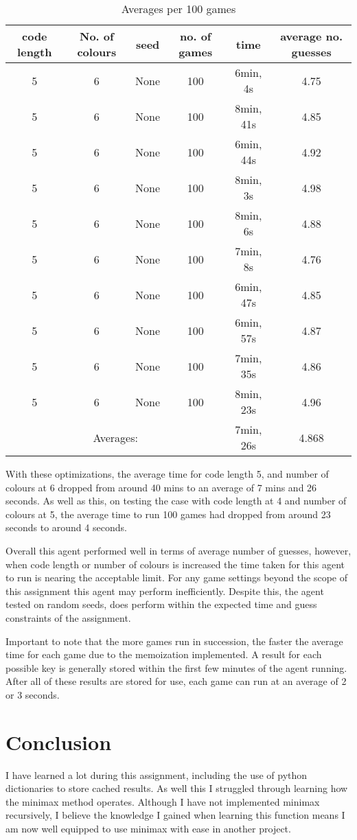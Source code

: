 \documentclass[12pt]{article}
\begin{document}
\begin{table}[htbp]
\centering
\begin{tabular}{|c|c|c|c|c|c|}
\hline
code length & No. of colours & seed & no. of games & time & average no. guesses\\\hline
5 & 6 & None & 100 & 6min, 4s & 4.75\\
5 & 6 & None & 100 & 8min, 41s & 4.85\\
5 & 6 & None & 100 & 6min, 44s & 4.92\\
5 & 6 & None & 100 & 8min, 3s & 4.98\\
5 & 6 & None & 100 & 8min, 6s & 4.88\\
5 & 6 & None & 100 & 7min, 8s & 4.76\\
5 & 6 & None & 100 & 6min, 47s & 4.85\\
5 & 6 & None & 100 & 6min, 57s & 4.87\\
5 & 6 & None & 100 & 7min, 35s & 4.86\\
5 & 6 & None & 100 & 8min, 23s & 4.96\\
\hline
\multicolumn{4}{|c|}{Averages: } & 7min, 26s & 4.868\\
\hline
\end{tabular}
\caption{\label{tab:results2}Averages per 100 games}
\end{table}
With these optimizations, the average time for code length 5, and number of colours at 6 dropped from around 40 mins to an average of 7 mins and 26 seconds. As well as this, on testing the case with code length at 4 and number of colours at 5, the average time to run 100 games had dropped from around 23 seconds to around 4 seconds.

Overall this agent performed well in terms of average number of guesses, however, when code length or number of colours is increased the time taken for this agent to run is nearing the acceptable limit. For any game settings beyond the scope of this assignment this agent may perform inefficiently. Despite this, the agent tested on random seeds, does perform within the expected time and guess constraints of the assignment.

Important to note that the more games run in succession, the faster the average time for each game due to the memoization implemented. A result for each possible key is generally stored within the first few minutes of the agent running. After all of these results are stored for use, each game can run at an average of 2 or 3 seconds.


\section{Conclusion}
I have learned a lot during this assignment, including the use of python dictionaries to store cached results. As well this I struggled through learning how the minimax method operates. Although I have not implemented minimax recursively, I believe the knowledge I gained when learning this function means I am now well equipped to use minimax with ease in another project.
\end{document}
